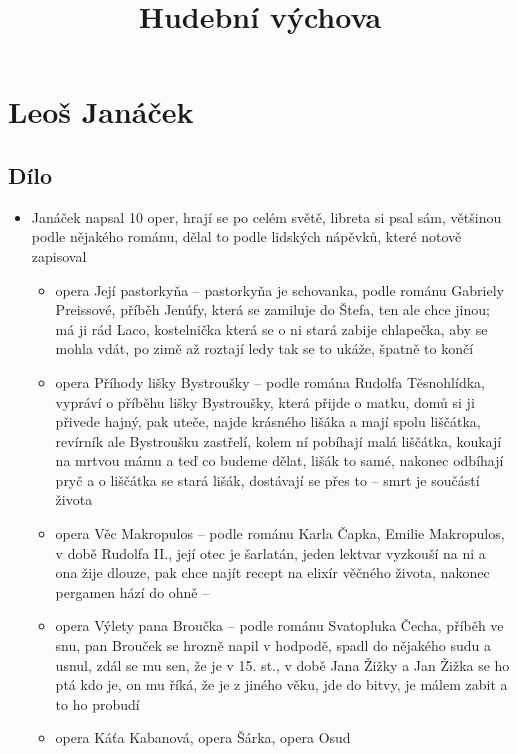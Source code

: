 \documentclass{article}
\title{\vspace{-2cm}\textbf{Hudební výchova}\vspace{-1.7cm}}
\date{}
\author{}
\begin{document}
\maketitle

\section{Leoš Janáček}
\subsection{Dílo}
\begin{itemize}
  \item Janáček napsal 10 oper, hrají se po celém světě, libreta si psal sám, většinou podle nějakého románu, dělal to podle lidských nápěvků, které notově zapisoval
  \begin{itemize}
    \item opera Její pastorkyňa -- pastorkyňa je schovanka, podle románu Gabriely Preissové, příběh Jenúfy, která se zamiluje do Štefa, ten ale chce jinou; má ji rád Laco, kostelnička která se o ni stará zabije chlapečka, aby se mohla vdát, po zimě až roztají ledy tak se to ukáže, špatně to končí
    \item opera Příhody lišky Bystroušky -- podle romána Rudolfa Těsnohlídka, vypráví o příběhu lišky Bystroušky, která přijde o matku, domů si ji přivede hajný, pak uteče, najde krásného lišáka a mají spolu liščátka, revírník ale Bystroušku zastřelí, kolem ní pobíhají malá liščátka, koukají na mrtvou mámu a teď co budeme dělat, lišák to samé, nakonec odbíhají pryč a o liščátka se stará lišák, dostávají se přes to -- smrt je součástí života
    \item opera Věc Makropulos -- podle románu Karla Čapka, Emilie Makropulos, v době Rudolfa II., její otec je šarlatán, jeden lektvar vyzkouší na ni a ona žije dlouze, pak chce najít recept na elixír věčného života, nakonec pergamen hází do ohně -- 
    \item opera Výlety pana Broučka -- podle románu Svatopluka Čecha, příběh ve snu, pan Brouček se hrozně napil v hodpodě, spadl do nějakého sudu a usnul, zdál se mu sen, že je v 15. st., v době Jana Žižky a Jan Žižka se ho ptá kdo je, on mu říká, že je z jiného věku, jde do bitvy, je málem zabit a to ho probudí
    \item opera Káťa Kabanová, opera Šárka, opera Osud
  \end{itemize}

\end{itemize}
\end{document}
